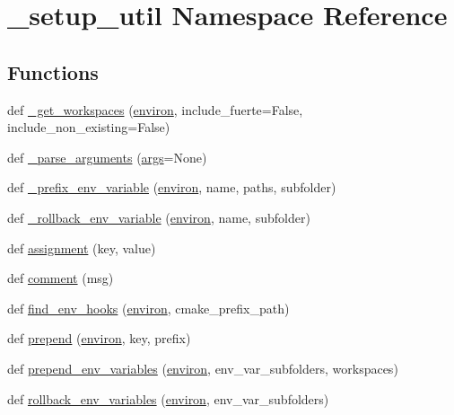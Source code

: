 \hypertarget{namespace__setup__util}{}\section{\+\_\+setup\+\_\+util Namespace Reference}
\label{namespace__setup__util}
\subsection*{Functions}
\begin{DoxyCompactItemize}
\item 
def \hyperlink{namespace__setup__util_ab2be07aa31918f1e1e34d6b7c4d66fcb}{\+\_\+get\+\_\+workspaces} (\hyperlink{namespace__setup__util_a9a935bdd9ee1aa0327161025bb18c136}{environ}, include\+\_\+fuerte=False, include\+\_\+non\+\_\+existing=False)
\item 
def \hyperlink{namespace__setup__util_a57d9ecb280810c9a5409d44aeb9d0a25}{\+\_\+parse\+\_\+arguments} (\hyperlink{namespace__setup__util_a547963d07c6371df1c51b1384a2dec28}{args}=None)
\item 
def \hyperlink{namespace__setup__util_a01264d729d05078ec7ee1cad54fe6489}{\+\_\+prefix\+\_\+env\+\_\+variable} (\hyperlink{namespace__setup__util_a9a935bdd9ee1aa0327161025bb18c136}{environ}, name, paths, subfolder)
\item 
def \hyperlink{namespace__setup__util_a45389205be3d6e2efe8b6f8409a8059b}{\+\_\+rollback\+\_\+env\+\_\+variable} (\hyperlink{namespace__setup__util_a9a935bdd9ee1aa0327161025bb18c136}{environ}, name, subfolder)
\item 
def \hyperlink{namespace__setup__util_ad56c24837fa4eddc63c03fbc7035628f}{assignment} (key, value)
\item 
def \hyperlink{namespace__setup__util_abe8c95c4cfe8b1374dacd5f91d984353}{comment} (msg)
\item 
def \hyperlink{namespace__setup__util_a73de35ca77f260af6691470342ab49ce}{find\+\_\+env\+\_\+hooks} (\hyperlink{namespace__setup__util_a9a935bdd9ee1aa0327161025bb18c136}{environ}, cmake\+\_\+prefix\+\_\+path)
\item 
def \hyperlink{namespace__setup__util_ae78d86b2c4279f5b8b1acaa146c35802}{prepend} (\hyperlink{namespace__setup__util_a9a935bdd9ee1aa0327161025bb18c136}{environ}, key, prefix)
\item 
def \hyperlink{namespace__setup__util_a832417d18b85bd1d276a87547e86f860}{prepend\+\_\+env\+\_\+variables} (\hyperlink{namespace__setup__util_a9a935bdd9ee1aa0327161025bb18c136}{environ}, env\+\_\+var\+\_\+subfolders, workspaces)
\item 
def \hyperlink{namespace__setup__util_af3030db6102b5aa35cd354a2fb6cca03}{rollback\+\_\+env\+\_\+variables} (\hyperlink{namespace__setup__util_a9a935bdd9ee1aa0327161025bb18c136}{environ}, env\+\_\+var\+\_\+subfolders)
\end{DoxyCompactItemize}
